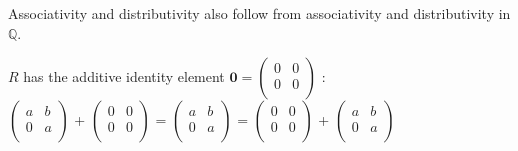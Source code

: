 Associativity and distributivity also follow from associativity and distributivity in $\mathbb{Q}$.

$R$ has the additive identity element $\mathbf{0} = \left(%
    \begin{array}{cc}
      0 & 0 \\
      0 & 0 \\
    \end{array}%
    \right)$ : \\
$\left(%
\begin{array}{cc}
  a & b \\
  0 & a \\
\end{array}%
\right)$ + 
    $\left(%
    \begin{array}{cc}
      0 & 0 \\
      0 & 0 \\
    \end{array}%
    \right)$ = 
    $\left(%
    \begin{array}{cc}
      a & b \\
      0 & a \\
    \end{array}%
    \right)$ =
    $\left(%
    \begin{array}{cc}
      0 & 0 \\
      0 & 0 \\
    \end{array}%
    \right)$ + 
$\left(%
\begin{array}{cc}
  a & b \\
  0 & a \\
\end{array}%
\right)$

